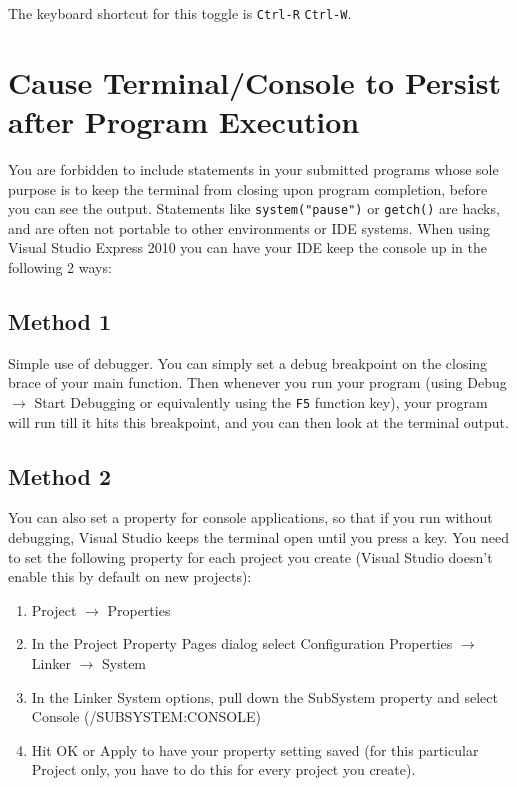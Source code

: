 \documentclass[11pt]{article}
\begin{document}
The keyboard shortcut for this toggle is \verb~Ctrl-R~ \verb~Ctrl-W~.
\section{Cause Terminal/Console to Persist after Program Execution}
\label{sec-5}

You are forbidden to include statements in your submitted programs
whose sole purpose is to keep the terminal from closing upon program
completion, before you can see the output.  Statements like
\verb~system("pause")~ or \verb~getch()~ are hacks, and are often not portable
to other environments or IDE systems.  When using Visual Studio Express 2010
you can have your IDE keep the console up in the following 2 ways:
\subsection{Method 1}
\label{sec-5-1}

Simple use of debugger.  You can simply set a debug breakpoint on the
closing brace of your main function.  Then whenever you run your
program (using Debug $\rightarrow$ Start Debugging or equivalently
using the \verb~F5~ function key), your program will run till it hits this
breakpoint, and you can then look at the terminal output.
\subsection{Method 2}
\label{sec-5-2}

You can also set a property for console applications, so that if you
run without debugging, Visual Studio keeps the terminal open until
you press a key.  You need to set the following property for each
project you create (Visual Studio doesn't enable this by default
on new projects):

\begin{enumerate}
\item Project $\rightarrow$ Properties
\item In the Project Property Pages dialog select Configuration Properties $\rightarrow$ Linker $\rightarrow$ System
\item In the Linker System options, pull down the SubSystem property and select Console (/SUBSYSTEM:CONSOLE)
\item Hit OK or Apply to have your property setting saved (for this particular Project only, you have to do this for every project you create).
\end{enumerate}
\end{document}
